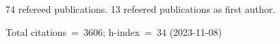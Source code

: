 74 refereed publications. 13 refeered publications as first author.

Total citations~=~3606; h-index~=~34 (2023-11-08)